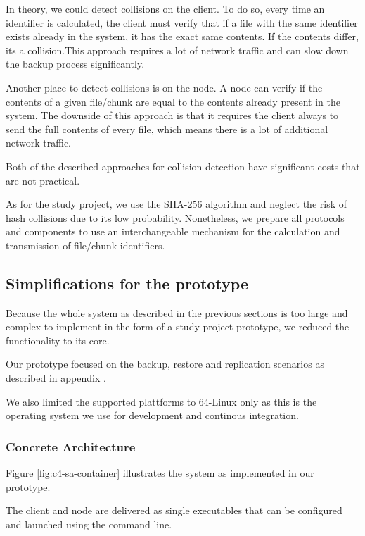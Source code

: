 In theory, we could detect collisions on the client. To do so, every time an identifier is calculated, the client must verify that if a file with the same identifier exists already in the system, it has the exact same contents. If the contents differ, its a collision.This approach requires a lot of network traffic and can slow down the backup process significantly.

Another place to detect collisions is on the node. A node can verify if the contents of a given file/chunk are equal to the contents already present in the system. The downside of this approach is that it requires the client always to send the full contents of every file, which means there is a lot of additional network traffic.

Both of the described approaches for collision detection have significant costs that are not practical.

As for the study project, we use the SHA-256 algorithm\cite{sha-256} and neglect the risk of hash collisions due to its low probability. Nonetheless, we prepare all protocols and components to use an interchangeable mechanism for the calculation and transmission of file/chunk identifiers.

\subsection{Simplifications for the prototype}

Because the whole system as described in the previous sections is too large and complex to implement in the form of a study project prototype, we reduced the functionality to its core.

Our prototype focused on the backup, restore and replication scenarios as described in appendix .

We also limited the supported plattforms to 64-Linux only as this is the operating system we use for development and continous integration.

\subsubsection{Concrete Architecture}

Figure \ref{fig:c4-sa-container} illustrates the system as implemented in our prototype.

The \gls{client} and \gls{node} are delivered as single executables that can be configured and launched using the command line.

